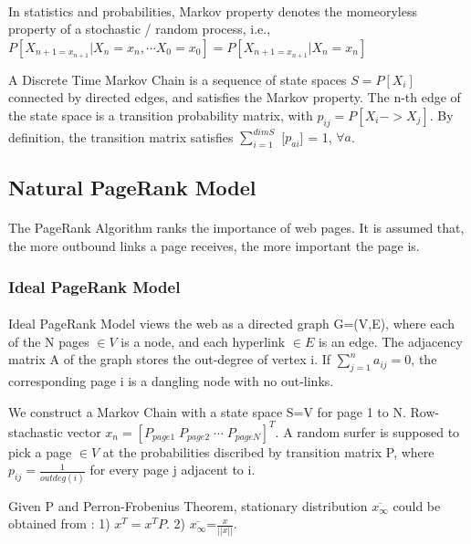 \documentclass[a0,portrait]{a0poster}
\begin{document}
\begin{multicols}{2}
        \paragraph{}
        In statistics and probabilities, Markov property denotes the momeoryless property of a stochastic / random process, i.e.,
        $P[X_{n+1=x_{n+1}}\vert X_n=x_n,\cdots X_0=x_0]=P[X_{n+1=x_{n+1}}\vert X_n=x_n]$
        
        A Discrete Time Markov Chain is a sequence of state spaces $S={P[X_i]}$ connected by directed edges, and satisfies the Markov property.
        The n-th edge of the state space is a transition probability matrix, with $p_{ij}=P[X_i->X_j]$.
        By definition, the transition matrix satisfies $\sum_{i=1}^{dim S}$ [$p_{ai}$] = 1, $\forall a$.
      \subsection*{Natural PageRank Model}
      \paragraph{}
        The PageRank Algorithm ranks the importance of web pages. It is assumed that, the more outbound links a page receives, the more important the page is.
        \subsubsection*{Ideal PageRank Model}
        \paragraph{}
        Ideal PageRank Model views the web as a directed graph G=(V,E), where each of the N pages $\in V$ is a node, and each hyperlink $\in E$ is an edge.
        The adjacency matrix A of the graph stores the out-degree of vertex i. If $\sum^n_{j=1}a_{ij}=0$, the corresponding page i is a dangling node with no out-links.
        
        We construct a Markov Chain with a state space S=V for page 1 to N. Row-stachastic vector $x_n=\left[P_{page1}\;P_{page2}\;\cdots\;P_{pageN}\right]^T$.
        A random surfer is supposed to pick a page $\in V$ at the probabilities discribed by 
        transition matrix P, where $p_{ij}=\frac{1}{outdeg(i)}$ for every page j adjacent to i.
        
        Given P and Perron-Frobenius Theorem, stationary distribution $\overline{x_\infty}$ could be obtained from 
        : 1) $x^T=x^TP$.
          2) $\overline{x_\infty}$=$\frac{x}{||x||}$.
      

\end{multicols}
\end{document}
